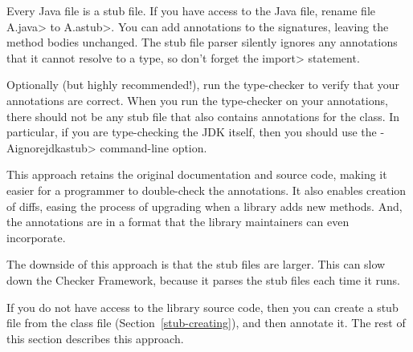 Every Java file is a stub file.  If you have access to the Java file,
rename file \<A.java> to \<A.astub>.  You can add
annotations to the signatures, leaving the method bodies unchanged.
The stub file parser silently ignores any annotations that it cannot
resolve to a type, so don't forget the \<import> statement.

Optionally (but highly recommended!), run the type-checker to verify that
your annotations are correct.  When you run the type-checker on your
annotations, there should not be any stub file that also contains
annotations for the class.  In particular, if you are type-checking the JDK
itself, then you should use the \<-Aignorejdkastub> command-line option.

This approach retains the original
documentation and source code, making it easier for a programmer to
double-check the annotations.  It also enables creation of diffs, easing
the process of upgrading when a library adds new methods.  And, the
annotations are in a format that the library maintainers can even
incorporate.

The downside of this approach is that the stub files are larger.  This can
slow down the Checker Framework, because it parses the stub files each time
it runs.



If you do not have access to the library source code, then you can create a
stub file from the class file (Section~\ref{stub-creating}),
and then annotate it.  The rest of this section describes this approach.


